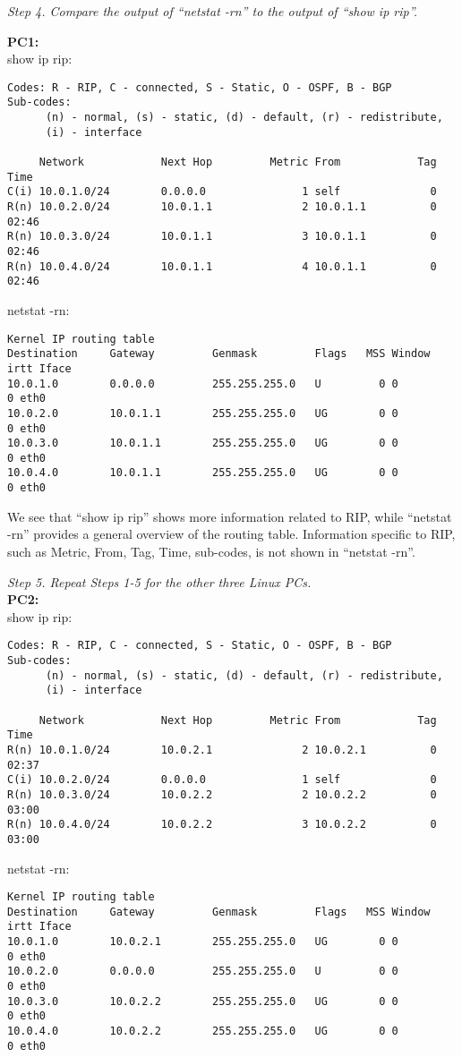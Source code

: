 \emph{Step 4. Compare the output of ``netstat -rn'' to the output of ``show ip rip''.}

\textbf{PC1:} \\
show ip rip:
\begin{lstlisting}
Codes: R - RIP, C - connected, S - Static, O - OSPF, B - BGP
Sub-codes:
      (n) - normal, (s) - static, (d) - default, (r) - redistribute,
      (i) - interface

     Network            Next Hop         Metric From            Tag Time
C(i) 10.0.1.0/24        0.0.0.0               1 self              0
R(n) 10.0.2.0/24        10.0.1.1              2 10.0.1.1          0 02:46
R(n) 10.0.3.0/24        10.0.1.1              3 10.0.1.1          0 02:46
R(n) 10.0.4.0/24        10.0.1.1              4 10.0.1.1          0 02:46
\end{lstlisting}
netstat -rn:
\begin{lstlisting}
Kernel IP routing table
Destination     Gateway         Genmask         Flags   MSS Window  irtt Iface
10.0.1.0        0.0.0.0         255.255.255.0   U         0 0          0 eth0
10.0.2.0        10.0.1.1        255.255.255.0   UG        0 0          0 eth0
10.0.3.0        10.0.1.1        255.255.255.0   UG        0 0          0 eth0
10.0.4.0        10.0.1.1        255.255.255.0   UG        0 0          0 eth0
\end{lstlisting}

We see that ``show ip rip'' shows more information related to RIP, while ``netstat -rn'' provides a general overview of the routing table.
Information specific to RIP, such as Metric, From, Tag, Time, sub-codes, is not shown in ``netstat -rn''.  

\emph{Step 5. Repeat Steps 1-5 for the other three Linux PCs.} \\

\textbf{PC2:} \\
show ip rip:
\begin{lstlisting}
Codes: R - RIP, C - connected, S - Static, O - OSPF, B - BGP
Sub-codes:
      (n) - normal, (s) - static, (d) - default, (r) - redistribute,
      (i) - interface

     Network            Next Hop         Metric From            Tag Time
R(n) 10.0.1.0/24        10.0.2.1              2 10.0.2.1          0 02:37
C(i) 10.0.2.0/24        0.0.0.0               1 self              0
R(n) 10.0.3.0/24        10.0.2.2              2 10.0.2.2          0 03:00
R(n) 10.0.4.0/24        10.0.2.2              3 10.0.2.2          0 03:00
\end{lstlisting}
netstat -rn:
\begin{lstlisting}
Kernel IP routing table
Destination     Gateway         Genmask         Flags   MSS Window  irtt Iface
10.0.1.0        10.0.2.1        255.255.255.0   UG        0 0          0 eth0
10.0.2.0        0.0.0.0         255.255.255.0   U         0 0          0 eth0
10.0.3.0        10.0.2.2        255.255.255.0   UG        0 0          0 eth0
10.0.4.0        10.0.2.2        255.255.255.0   UG        0 0          0 eth0
\end{lstlisting}


